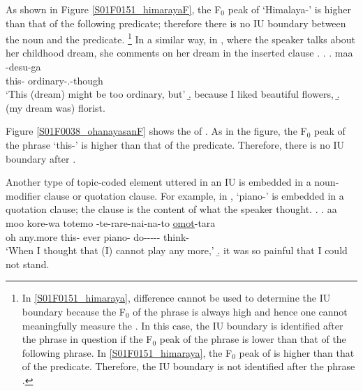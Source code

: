As shown in Figure \ref{S01F0151_himarayaF},
the F$_{0}$ peak of  `Himalaya-' is higher than
that of the following predicate;
therefore there is no IU boundary between the noun and the predicate.%
	\footnote{
	In \ref{S01F0151_himaraya},  difference cannot be used
	to determine the IU boundary
	because the F$_{0}$ of the phrase  is always high
	and hence one cannot meaningfully measure the .
	In this case, the IU boundary is identified after the phrase in question
	if the F$_{0}$ peak of the phrase is lower than that of the following phrase.
	In \ref{S01F0151_himaraya}, the F$_{0}$ peak of  is higher than that of the predicate.
	Therefore, the IU boundary is not identified after the phrase 
	\cite[see][p.~420 ff.]{igarashietal06}.
	}
In a similar way,
in \Next, where the speaker talks about her childhood dream,
she comments on her dream in the inserted clause \Next[a].
%
\ex.\label{S01F0038_ohanayasan}
 \ag. maa  -desu-ga \tp{\dvline} \\
 		 this- ordinary-.-though {} \\
		`This (dream) might be too ordinary, but'
 \b. because I liked beautiful flowers,
 \b. (my dream was) florist.

Figure \ref{S01F0038_ohanayasanF} shows the  of \Last[a].
As in the figure,
the F$_{0}$ peak of the  phrase  `this-' is higher than that of the predicate.
Therefore, there is no IU boundary after .

Another type of topic-coded element uttered in an  IU is
embedded in a noun-modifier clause or quotation clause.
For example, in \Next[a],
 `piano-' is embedded in a quotation clause;
the clause is the content of what the speaker thought.
%
\ex.\label{S00F0209_piano}
 \ag. aa moo \tp{\dvline} kore-wa totemo  -te-rare-nai-na-to \ul{\ul{omot}}-tara \tp{\dvline} \\
 	oh any.more {} this- ever piano- do----- think- {} \\
	`When I thought that (I) cannot play  any more,'
 \b. it was so painful that I could not stand.

